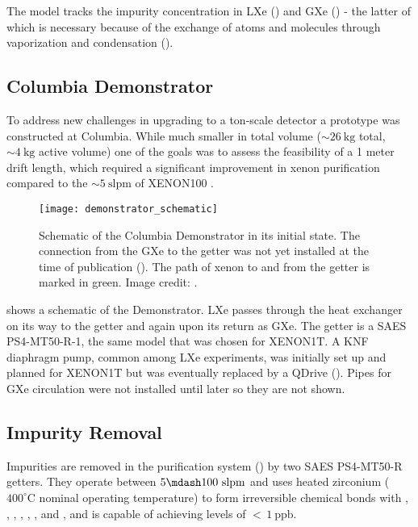 The model tracks the impurity concentration in LXe (\il) and GXe (\ig) - the latter of which is necessary because of the
exchange of atoms and molecules through vaporization and condensation ().



\subsection{Columbia Demonstrator}
\label{subsec:electron_lifetime_model_demonstrator}
To address new challenges in upgrading to a ton-scale detector a prototype was constructed at Columbia.  While much smaller in total
volume (${\sim}26\ \mathrm{kg}$ total, ${\sim}4\ \mathrm{kg}$ active volume) one of the goals was to assess the feasibility of a 1 meter
drift length, which required a significant improvement in xenon purification compared to the ${\sim}5\ \mathrm{slpm}$ of XENON100
.

\begin{figure}
\centering
\texttt{[image: demonstrator\_schematic]}
\caption{Schematic of the Columbia Demonstrator in its initial state.  The connection from the GXe to the getter was not yet installed
at the time of publication ().  The path of xenon to and from the getter is marked in
green.  Image credit: .}
\label{fig:electron_lifetime_model_demonstrator_schematic}
\end{figure}

 shows a schematic of the Demonstrator.  LXe passes through the heat exchanger
on its way to the getter and again upon its return as GXe.  The getter is a SAES PS4-MT50-R-1, the same model that was chosen for
XENON1T.  A KNF diaphragm pump, common among LXe experiments, was initially set up and planned for XENON1T but was eventually
replaced by a QDrive ().  Pipes for GXe circulation were not installed until later so they are not shown.



\subsection{Impurity Removal}
\label{subsec:electron_lifetime_model_removal}
Impurities are removed in the purification system () by two SAES PS4-MT50-R getters.  They operate between
$5 \mdash 100\ \mathrm{slpm}$ and uses heated zirconium ($400^{\circ}\mathrm{C}$ nominal operating temperature) to form irreversible
chemical bonds with , , , , , , and , and is capable of achieving levels of
${<}\, 1\ \mathrm{ppb}$.

